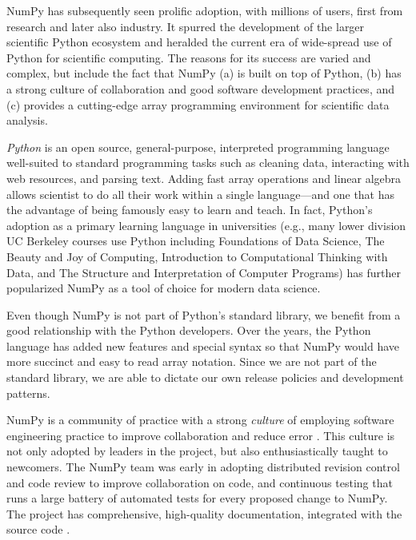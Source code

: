 NumPy has subsequently seen prolific adoption, with millions of users,
first from research and later also industry.
It spurred the development of the larger scientific Python ecosystem and
heralded the current era of wide-spread use of Python for scientific computing.
The reasons for its success are varied and complex, but include the fact that
NumPy (a) is built on top of Python,
(b) has a strong culture of collaboration and good software development practices, and
(c) provides a cutting-edge array programming environment for scientific data analysis.

\emph{Python} is an open source, general-purpose, interpreted programming language
well-suited to standard programming tasks such as cleaning data,
interacting with web resources, and parsing text.
Adding fast array operations and linear algebra allows scientist to do all
their work within a single language---and one that has the advantage of
being famously easy to learn and teach.
In fact, Python's adoption as a primary learning language in universities
(e.g., many lower division UC Berkeley courses use Python including
Foundations of Data Science,
The Beauty and Joy of Computing,
Introduction to Computational Thinking with Data,
and The Structure and Interpretation of Computer Programs) has
further popularized NumPy as a tool of choice for modern data science.

Even though NumPy is not part of Python's standard library,
we benefit from a good relationship with the Python developers.
Over the years, the Python language has added new features and
special syntax so that NumPy would have more succinct and 
easy to read array notation.
Since we are not part of the standard library, we are able to
dictate our own release policies and development patterns.

NumPy is a community of practice with a strong \emph{culture} of
employing software engineering practice to improve collaboration and
reduce error \cite{millman2014developing}.  This culture is not only
adopted by leaders in the project, but also enthusiastically taught to
newcomers. The NumPy team was early in adopting distributed revision
control and code review to improve collaboration on code, and
continuous testing that runs a large battery of automated tests for
every proposed change to NumPy.  The project has comprehensive,
high-quality documentation, integrated with the source
code \cite{vanderwalt2008scipy,harrington2008scipy,harrington2009scipy}.

